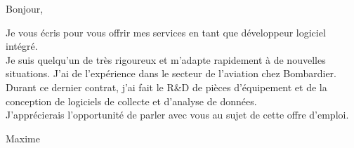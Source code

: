\documentclass[12pt,french]{letter}
\begin{document}

\begin{letter}{}
\address{Montréal, Canada}

\opening{Bonjour,}


Je vous écris pour vous offrir mes services en tant que développeur logiciel intégré.
\\ Je suis quelqu'un de très rigoureux et m'adapte rapidement à de nouvelles situations. J'ai de l'expérience dans le secteur de l'aviation chez Bombardier. Durant ce dernier contrat, j'ai fait le R\&D de pièces d'équipement et de la conception de logiciels de collecte et d'analyse de données. 
\\J'apprécierais l'opportunité de parler avec vous au sujet de cette offre d'emploi.

\closing{Maxime}


\end{letter}
\end{document}
